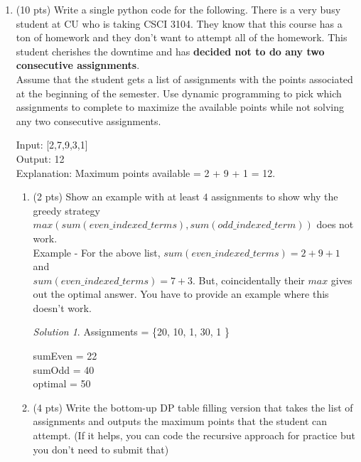\documentclass[12pt]{article}
\theoremstyle{remark}
\newtheorem*{solution}{Solution}
\begin{document}
\begin{enumerate}
    \item (10 pts) Write a single python code for the following. There is a very busy student at CU who is taking CSCI 3104. They know that this course has a ton of homework and they don't want to attempt all of the homework. This student cherishes the downtime and has \textbf{decided not to do any two consecutive assignments}.
    \\
    Assume that the student gets a list of assignments with the points associated at the beginning of the semester. Use dynamic programming to pick which assignments to complete to maximize the available points while not solving any two consecutive assignments. 
    
    Input: [2,7,9,3,1]\\
    Output: 12\\
    Explanation: Maximum points available = 2 + 9 + 1 = 12.\\
    
    
    
    \begin{enumerate}
        \item (2 pts) Show an example with at least $4$ assignments to show why the greedy strategy \\ $max( sum( even\_indexed\_terms) , sum ( odd\_indexed\_term))$ does not work.\\
        Example - For the above list, $sum( even\_indexed\_terms) = 2+9+1$ and \\ $sum( even\_indexed\_terms) = 7+3$. But, coincidentally their $max$ gives out the optimal answer. You have to provide an example where this doesn't work.
        \begin{solution}
Assignments = \{20, 10, 1, 30, 1 \}

sumEven = 22 \\
sumOdd = 40 \\
optimal = 50
        \end{solution}
        
        \item (4 pts) Write the bottom-up DP table filling version that takes the list of assignments and outputs the maximum points that the student can attempt. (If it helps, you can code the recursive approach for practice but you don't need to submit that)
        

\end{enumerate}
\end{enumerate}
\end{document}
